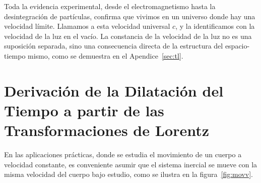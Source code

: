 \documentclass[11pt,a4paper]{book}
\begin{document}
Toda la evidencia experimental, desde el electromagnetismo hasta la desintegración de partículas, confirma que vivimos en un universo donde hay una velocidad límite. Llamamos a esta velocidad universal $c$, y la identificamos con la velocidad de la luz en el vacío. La constancia de la velocidad de la luz no es una suposición separada, sino una consecuencia directa de la estructura del espacio-tiempo mismo, como se demuestra en el Apendice~\ref{sec:tl}.




\section{Derivación de la Dilatación del Tiempo a partir de las Transformaciones de Lorentz}

En las aplicaciones prácticas, donde se estudia el movimiento de un cuerpo a velocidad constante, es conveniente asumir que el sistema inercial se mueve con la misma velocidad del cuerpo bajo estudio, como se ilustra en la figura~\ref{fig:movv}.
\end{document}
